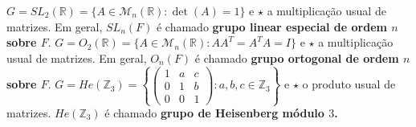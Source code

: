 \documentclass[12pt, a4paper]{article}
\newcommand{\negrito}[1]{\mbox{\boldmath{$#1$}}}
\begin{document}
\begin{tasks}[counter-format={(tsk[a])},label-width=3.6ex, label-format = {\bfseries}, column-sep = {0pt}]
\task[\textcolor{Floresta}{$\negrito{(h)} $}] $G = SL_2(\mathbb{R}) = \{ A \in \mathcal{M}_n(\mathbb{R}) : \det(A)= 1 \}$ e $\star$ a multiplicação usual de matrizes. Em geral, $SL_n(F)$ é chamado \textbf{grupo linear especial de ordem $n$ sobre $F.$}
\task[\textcolor{Floresta}{$\negrito{(i)} $}] $G = O_2(\mathbb{R}) = \{ A \in \mathcal{M}_n(\mathbb{R}) : AA^T = A^TA = I \}$ e $\star$ a multiplicação usual de matrizes. Em geral, $O_n(F)$ é chamado \textbf{grupo ortogonal de ordem $n$ sobre $F.$}
\task[\textcolor{Floresta}{$\negrito{(j)} $}] $G = He(\mathbb{Z}_3) = \left\{ \left( \begin{array}{ccc} 1 & a & c \\ 0 & 1 & b \\ 0 & 0 & 1 \end{array} \right) : a,b,c \in \mathbb{Z}_3 \right\}$ e $\star$ o produto usual de matrizes. $ He(\mathbb{Z}_3)$ é chamado \textbf{grupo de Heisenberg módulo $3$.}
\end{tasks}
\end{document}
